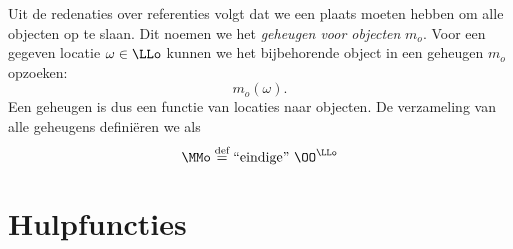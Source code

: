 Uit de redenaties over referenties volgt dat we een plaats moeten hebben om alle objecten op te slaan. Dit noemen we het \emph{geheugen voor objecten} $m_o$. Voor een gegeven locatie $\omega\in\LLo$ kunnen we het bijbehorende object in een geheugen $m_o$ opzoeken:
%
\begin{equation*}
  m_o(\omega).
\end{equation*}
%
Een geheugen is dus een functie van locaties naar objecten. De verzameling van alle geheugens definiëren we als
%
\begin{equation*}
  \MMo \DEF \FiniteFunctions{\OO}{\LLo}
\end{equation*}

\section{Hulpfuncties}

